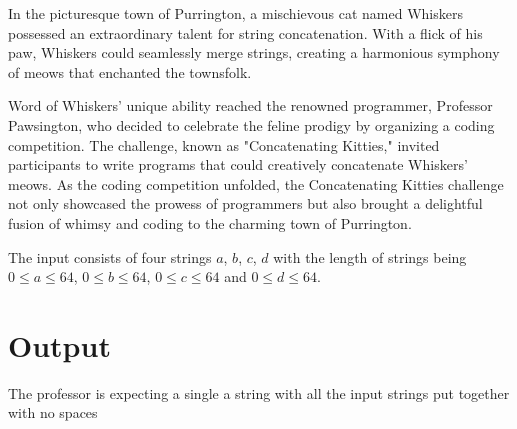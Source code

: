 In the picturesque town of Purrington, a mischievous cat named Whiskers possessed an extraordinary talent for string concatenation. With a flick of his paw, Whiskers could seamlessly merge strings, creating a harmonious symphony of meows that enchanted the townsfolk.

Word of Whiskers' unique ability reached the renowned programmer, Professor Pawsington, who decided to celebrate the feline prodigy by organizing a coding competition. The challenge, known as "Concatenating Kitties," invited participants to write programs that could creatively concatenate Whiskers' meows. As the coding competition unfolded, the Concatenating Kitties challenge not only showcased the prowess of programmers but also brought a delightful fusion of whimsy and coding to the charming town of Purrington.

\begin{Input}
The input consists of four strings $a$, $b$, $c$, $d$ with the length of strings being
$0\leq a\leq 64$,
$0\leq b\leq 64$, 
$0\leq c\leq 64$ and
$0\leq d\leq 64$.
\end{Input}

\section*{Output}
The professor is expecting a single a string with all the input strings put together with no spaces
